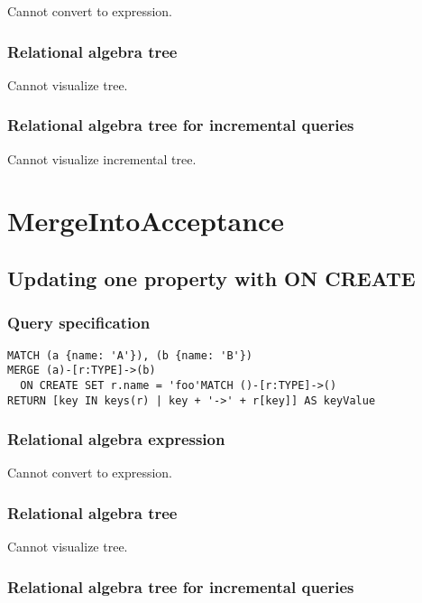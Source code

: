 Cannot convert to expression.

\subsubsection*{Relational algebra tree}

Cannot visualize tree.

\subsubsection*{Relational algebra tree for incremental queries}

Cannot visualize incremental tree.

\section{MergeIntoAcceptance}

\subsection{Updating one property with ON CREATE}

\subsubsection*{Query specification}

\begin{lstlisting}
MATCH (a {name: 'A'}), (b {name: 'B'})
MERGE (a)-[r:TYPE]->(b)
  ON CREATE SET r.name = 'foo'MATCH ()-[r:TYPE]->()
RETURN [key IN keys(r) | key + '->' + r[key]] AS keyValue
\end{lstlisting}

\subsubsection*{Relational algebra expression}

Cannot convert to expression.

\subsubsection*{Relational algebra tree}

Cannot visualize tree.

\subsubsection*{Relational algebra tree for incremental queries}

